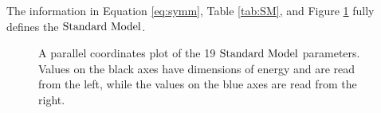 The information in Equation \ref{eq:symm}, Table \ref{tab:SM}, and Figure \ref{fig:parcorSM} fully defines the $\text{Standard\ Model}$.
\begin{figure}
\begin{centering}
\caption{A parallel coordinates plot of the 19 $\text{Standard\ Model}$ parameters. Values on the black axes have dimensions of energy and are read from the left, while the values on the blue axes are read from the right.}
\label{fig:parcorSM}
\end{centering}
\end{figure}


